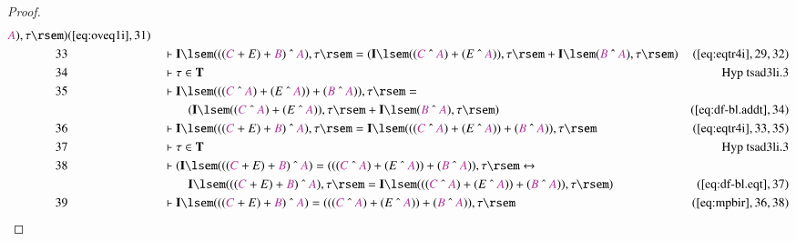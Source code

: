 \begin{proof}
\begin{align}
      \mc{A} ) , \tau \rsem
      )&(\mbox{\ref{eq:oveq1i}},31)\notag
  \\ 33 &&  & \vdash \mathbf{I} \lsem ( ( ( \mc{C} + E ) + \mc{B} ) ~\string^~
      \mc{A} ) , \tau \rsem = ( \mathbf{I} \lsem ( ( \mc{C}
      ~\string^~ \mc{A} ) + ( E ~\string^~ \mc{A} ) ) ,
      \tau \rsem + \mathbf{I} \lsem ( \mc{B} ~\string^~
      \mc{A} ) , \tau \rsem
      )&(\mbox{\ref{eq:eqtr4i}},29,32)\notag
  \\ 34 &&  & \vdash \tau \in
      \mathbf{T}&\text{Hyp~tsad3li.3}\notag%
  \\ 35 &&  & \vdash \mathbf{I} \lsem ( ( ( \mc{C} ~\string^~ \mc{A} ) + ( E
      ~\string^~ \mc{A} ) ) + ( \mc{B} ~\string^~ \mc{A} )
      ) , \tau \rsem =  \notag \\ & & & \qquad
     ( \mathbf{I} \lsem ( ( \mc{C}
      ~\string^~ \mc{A} ) + ( E ~\string^~ \mc{A} ) ) ,
      \tau \rsem + \mathbf{I} \lsem ( \mc{B} ~\string^~
      \mc{A} ) , \tau \rsem
      )&(\mbox{\ref{eq:df-bl.addt}},34)\notag
  \\ 36 &&  & \vdash \mathbf{I} \lsem ( ( ( \mc{C} + E ) + \mc{B} ) ~\string^~
      \mc{A} ) , \tau \rsem = \mathbf{I} \lsem ( ( ( \mc{C}
      ~\string^~ \mc{A} ) + ( E ~\string^~ \mc{A} ) ) + (
      \mc{B} ~\string^~ \mc{A} ) ) , \tau
      \rsem&(\mbox{\ref{eq:eqtr4i}},33,35)\notag
  \\ 37 &&  & \vdash \tau \in
      \mathbf{T}&\text{Hyp~tsad3li.3}\notag%
  \\ 38 &&  & \vdash ( \mathbf{I} \lsem ( ( ( \mc{C} + E ) + \mc{B} )
      ~\string^~ \mc{A} ) = ( ( ( \mc{C} ~\string^~ \mc{A}
      ) + ( E ~\string^~ \mc{A} ) ) + ( \mc{B} ~\string^~
      \mc{A} ) ) , \tau \rsem \leftrightarrow  \notag \\ & & & \qquad
     \mathbf{I}
      \lsem ( ( ( \mc{C} + E ) + \mc{B} ) ~\string^~ \mc{A}
      ) , \tau \rsem = \mathbf{I} \lsem ( ( ( \mc{C}
      ~\string^~ \mc{A} ) + ( E ~\string^~ \mc{A} ) ) + (
      \mc{B} ~\string^~ \mc{A} ) ) , \tau \rsem
      )&(\mbox{\ref{eq:df-bl.eqt}},37)\notag
  \\ 39 &&  & \vdash \mathbf{I} \lsem ( ( ( \mc{C} + E ) + \mc{B} ) ~\string^~
      \mc{A} ) = ( ( ( \mc{C} ~\string^~ \mc{A} ) + ( E
      ~\string^~ \mc{A} ) ) + ( \mc{B} ~\string^~ \mc{A} )
      ) , \tau \rsem&(\mbox{\ref{eq:mpbir}},36,38)\notag
\end{align}
\end{proof}

